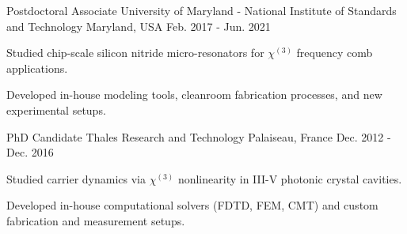\documentclass[11pt, a4paper]{customcv}
\begin{document}
{{        }
    \cventry%
        {Postdoctoral Associate} %
        {University of Maryland - National Institute of Standards and Technology} %
        {Maryland, USA} %
        {Feb. 2017 - Jun. 2021} %
        {
          \begin{cvitems} %
            \item {Studied chip-scale silicon nitride micro-resonators for $\chi^{(3)}$ frequency comb applications.}
            \item {Developed in-house modeling tools, cleanroom fabrication processes, and new experimental setups.}
          \end{cvitems}
        }
    \cventry
        {PhD Candidate} %
        {Thales Research and Technology} %
        {Palaiseau, France} %
        {Dec. 2012 - Dec. 2016} %
        {
          \begin{cvitems} %
            \item {Studied carrier dynamics via $\chi^{(3)}$ nonlinearity in III-V photonic crystal cavities.}
            \item {Developed in-house computational solvers (FDTD, FEM, CMT) and custom fabrication and measurement setups.}
          \end{cvitems}
        }
}%
\end{document}
